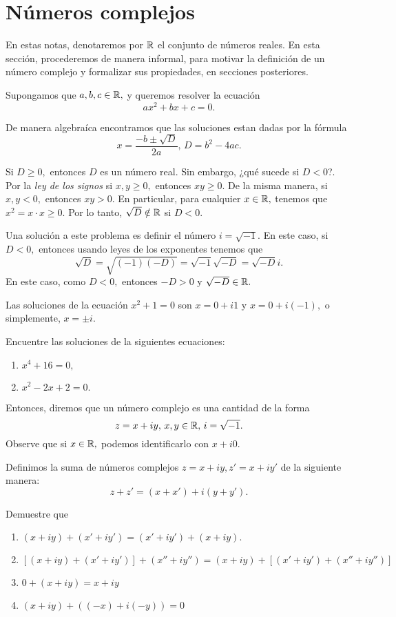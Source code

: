 \section{Números complejos}

En estas notas, denotaremos por $\mathbb{R}$ el conjunto de números reales. En esta sección, procederemos de manera informal,
para motivar la definición de un número complejo y formalizar sus propiedades, en secciones posteriores. 


Supongamos que $a,b,c\in \mathbb{R},$ y queremos resolver
la ecuación
$$
ax^2+bx+c=0.
$$

De manera algebraíca encontramos que las soluciones estan dadas por la fórmula
$$
x=\dfrac{-b\pm \sqrt{D}}{2a}, \, D=b^2-4ac.
$$

Si $D \geq 0,$ entonces $D$ es un número real. Sin embargo, ¿qué sucede si $D<0$?. Por la \emph{ley de los signos} si
$x,y\geq 0,$ entonces $xy\geq 0.$ De la misma manera, si $x,y<0,$ entonces $xy>0.$ En particular, para cualquier
$x\in \mathbb{R},$ tenemos que $x^{2}=x\cdot x\geq 0.$ Por lo tanto, $\sqrt{D} \notin \mathbb{R}$ si $D<0.$

Una solución a este problema es definir el número $i=\sqrt{-1}.$ En este caso, si $D<0,$ entonces usando leyes de los
exponentes tenemos que
$$
\sqrt{D}=\sqrt{(-1)(-D)}=\sqrt{-1}\sqrt{-D}=\sqrt{-D}i.
$$
En este caso, como $D<0,$ entonces $-D>0$ y $\sqrt{-D}\in \mathbb{R}.$

\begin{problema}
 Las soluciones de la ecuación $x^2+1=0$ son $x=0+i1$ y $x=0+i(-1),$ o simplemente, $x=\pm i.$
\end{problema}

\begin{problema}
 Encuentre las soluciones de la siguientes ecuaciones:
 \begin{enumerate}
  \item $x^{4}+16=0,$
  \item $x^{2}-2x+2=0.$
 \end{enumerate}

\end{problema}


 Entonces, diremos que un número complejo es una cantidad de la forma
 $$
z=x+iy, \, x,y\in \mathbb{R}, \, i=\sqrt{-1}.
 $$
 Observe que si $x\in \mathbb{R},$ podemos identificarlo con $x+i0.$

Definimos la suma de números complejos $z=x+iy,z'=x+iy'$ de la siguiente manera:
$$
z+z'=(x+x')+i(y+y').
$$

\begin{problema}
Demuestre que 
\begin{enumerate}
 \item $(x+iy)+(x'+iy')=(x'+iy')+(x+iy).$
 \item $\left[ (x+iy)+(x'+iy') \right] +(x''+iy'')= (x+iy)+\left[ (x'+iy') +(x''+iy'') \right]$
 \item $0+(x+iy)=x+iy$
 \item $(x+iy)+((-x)+i(-y))=0$
\end{enumerate}\end{problema}

